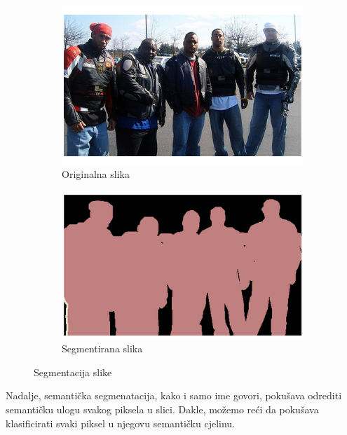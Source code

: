 \begin{enumerate}
\begin{figure}[htb]
	\centering
	\begin{subfigure}[b]{0.4\linewidth}
		\includegraphics[width=\linewidth]{img/OriginalImage.png}
		\caption{Originalna slika}
	\end{subfigure}
	\begin{subfigure}[b]{0.4\linewidth}
		\includegraphics[width=\linewidth]{img/ImageSegmentation.png}
		\caption{Segmentirana slika}
	\end{subfigure}
	\caption{Segmentacija slike}
	\label{img:segmentation}
\end{figure}

Nadalje, semantička segmenatacija, kako i samo ime govori, pokušava odrediti semantičku ulogu svakog piksela u slici. Dakle, možemo reći da pokušava klasificirati svaki piksel u njegovu semantičku cjelinu. 


\end{enumerate}

